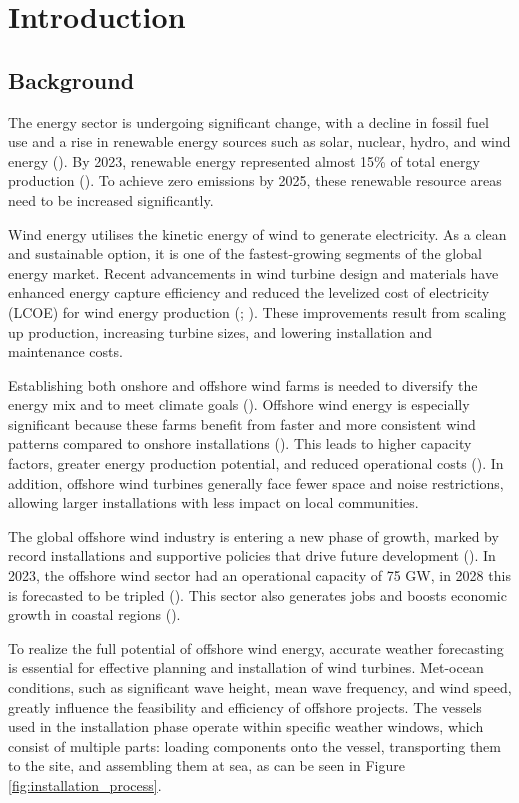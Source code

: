 \chapter{Introduction}

\section{Background}
The energy sector is undergoing significant change, with a decline in fossil fuel use and a rise in renewable energy sources such as solar, nuclear, hydro, and wind energy (\cite{IEA2024}). By 2023, renewable energy represented almost 15\% of total energy production (\cite{EnergyInstitute2024}). To achieve zero emissions by 2025, these renewable resource areas need to be increased significantly.

Wind energy utilises the kinetic energy of wind to generate electricity. As a clean and sustainable option, it is one of the fastest-growing segments of the global energy market. Recent advancements in wind turbine design and materials have enhanced energy capture efficiency and reduced the levelized cost of electricity (LCOE) for wind energy production (\cite{GWEC2024}; \cite{GWEC2024Offshore}). These improvements result from scaling up production, increasing turbine sizes, and lowering installation and maintenance costs.

Establishing both onshore and offshore wind farms is needed to diversify the energy mix and to meet climate goals (\cite{IEA2024}). Offshore wind energy is especially significant because these farms benefit from faster and more consistent wind patterns compared to onshore installations (\cite{GWEC2024Offshore}). This leads to higher capacity factors,  greater energy production potential, and reduced operational costs (\cite{GWEC2024}). In addition, offshore wind turbines generally face fewer space and noise restrictions, allowing larger installations with less impact on local communities.

The global offshore wind industry is entering a new phase of growth, marked by record installations and supportive policies that drive future development (\cite{GWEC2024}). In 2023, the offshore wind sector had an operational capacity of 75 GW, in 2028 this is forecasted to be tripled (\cite{GWEC2024Offshore}). This sector also generates jobs and boosts economic growth in coastal regions (\cite{GWEC2024}).

To realize the full potential of offshore wind energy, accurate weather forecasting is essential for effective planning and installation of wind turbines. Met-ocean conditions, such as significant wave height, mean wave frequency, and wind speed, greatly influence the feasibility and efficiency of offshore projects. The vessels used in the installation phase operate within specific weather windows, which consist of multiple parts: loading components onto the vessel, transporting them to the site, and assembling them at sea, as can be seen in Figure \ref{fig:installation_process}.

